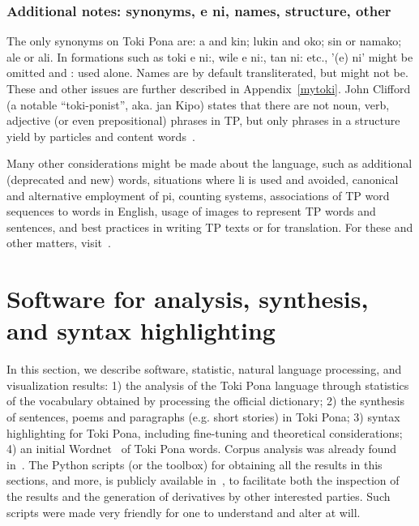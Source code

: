 
\subsubsection{Additional notes: synonyms, e ni, names, structure, other}\label{sec:add}
The only synonyms on Toki Pona are:
a and kin; lukin and oko; sin or namako;
ale or ali.
In formations such as
toki e ni:, wile e ni:, tan ni: etc.,
'(e) ni' might be omitted and : used alone.
Names are by default transliterated,
but might not be.
These and other issues are further described in Appendix~\ref{mytoki}.
John Clifford (a notable ``toki-ponist'', aka. jan Kipo)
states that there are not noun, verb, adjective (or even prepositional)
phrases in TP, but only phrases in a structure
yield by particles and content words~\cite{janKipo}.

Many other considerations might be made about the language,
such as additional (deprecated and new) words,
situations where li is used and avoided,
canonical and alternative employment of pi,
counting systems,
associations of TP word sequences to words in English,
usage of images to represent TP words and sentences,
and best practices in writing TP texts or for translation.
For these and other matters, visit~\cite{tpLang,kama,tp4,gdoc}.

\section{Software for analysis, synthesis, and syntax highlighting}\label{hacks}
In this section,
we describe software, statistic, natural language processing,
and visualization results:
1)
the analysis of the Toki Pona language through statistics
of the vocabulary obtained by processing the official dictionary;
2)
the synthesis of sentences, poems and paragraphs (e.g. short stories)
in Toki Pona;
3)
syntax highlighting for Toki Pona,
including fine-tuning and theoretical
considerations;
4)
an initial Wordnet~\cite{wordnet} of
Toki Pona words.
Corpus analysis was already found in~\cite{corpus}.
The Python scripts (or the toolbox)
for obtaining all the results in this sections,
and more, is publicly available in~\cite{tokipona},
to facilitate both the inspection of the results and the
generation of derivatives by other interested parties.
Such scripts were made very friendly for one to understand and alter
at will.


